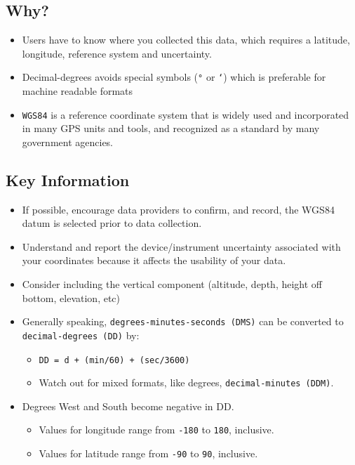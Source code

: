 \documentclass[
  oneside]{book}
\providecommand{\tightlist}{%
  \setlength{\itemsep}{0pt}\setlength{\parskip}{0pt}}
\begin{document}
\hypertarget{why-4}{%
\subsection{Why?}\label{why-4}}

\begin{itemize}
\tightlist
\item
  Users have to know where you collected this data, which requires a latitude, longitude, reference system and uncertainty.
\item
  Decimal-degrees avoids special symbols (\texttt{°} or \texttt{‘}) which is preferable for machine readable formats
\item
  \texttt{WGS84} is a reference coordinate system that is widely used and incorporated in many GPS units and tools, and recognized as a standard by many government agencies.
\end{itemize}

\hypertarget{key-information-4}{%
\subsection{Key Information}\label{key-information-4}}

\begin{itemize}
\tightlist
\item
  If possible, encourage data providers to confirm, and record, the WGS84 datum is selected prior to data collection.
\item
  Understand and report the device/instrument uncertainty associated with your coordinates because it affects the usability of your data.
\item
  Consider including the vertical component (altitude, depth, height off bottom, elevation, etc)
\item
  Generally speaking, \texttt{degrees-minutes-seconds\ (DMS)} can be converted to \texttt{decimal-degrees\ (DD)} by:

  \begin{itemize}
  \tightlist
  \item
    \texttt{DD\ =\ d\ +\ (min/60)\ +\ (sec/3600)}
  \item
    Watch out for mixed formats, like degrees, \texttt{decimal-minutes\ (DDM)}.
  \end{itemize}
\item
  Degrees West and South become negative in DD.

  \begin{itemize}
  \tightlist
  \item
    Values for longitude range from \texttt{-180} to \texttt{180}, inclusive.
  \item
    Values for latitude range from \texttt{-90} to \texttt{90}, inclusive.
  \end{itemize}
\end{itemize}
\end{document}
